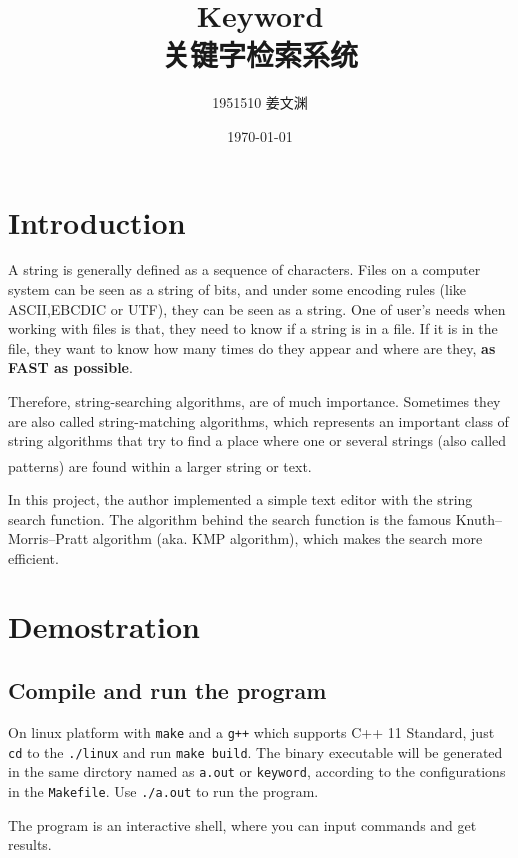 \documentclass[cn,black,12pt,normal]{elegantnote}
\title{Keyword\\关键字检索系统}
\author{1951510\; 姜文渊}
\institute{\small \url{https://github.com/jwyjohn/Jwy_DataStructureHomework}}
\date{\today}
\newcommand{\uct}[1]{\textsuperscript{\textsuperscript{\cite{#1}}}}
\begin{document}
\maketitle

\section{Introduction}
A string is generally defined as a sequence of characters. Files on a computer system can be seen as a string of bits, and under some encoding rules (like  ASCII,EBCDIC or UTF), they can be seen as a string. One of user's needs when working with files is that, they need to know if a string is in a file. If it is in the file, they want to know how many times do they appear and where are they, \textbf{as FAST as possible}.

Therefore, string-searching algorithms, are of much importance. Sometimes they are also called string-matching algorithms, which represents an important class of string algorithms that try to find a place where one or several strings (also called patterns) are found within a larger string or text.\uct{wiki:String-searching_algorithm}

In this project, the author implemented a simple text editor with the string search function. The algorithm behind the search function is the famous Knuth–Morris–Pratt algorithm (aka. KMP algorithm), which makes the search more efficient.

\section{Demostration}

\subsection{Compile and run the program}

On linux platform with \lstinline{make} and a \lstinline{g++} which supports C++ 11 Standard, just \lstinline{cd} to the \lstinline{./linux} and run \lstinline{make build}. The binary executable will be generated in the same dirctory named as \lstinline{a.out} or \lstinline{keyword}, according to the configurations in the \lstinline{Makefile}. Use \lstinline{./a.out} to run the program.

The program is an interactive shell, where you can input commands and get results.
\end{document}
